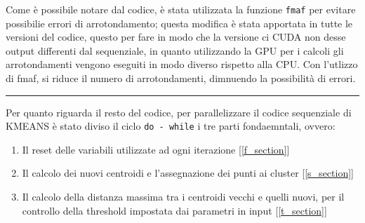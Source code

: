 \documentclass{article}
\begin{document}
  Come è possibile notare dal codice, è stata utilizzata la funzione \verb|fmaf| per evitare possibilie errori
  di arrotondamento; questa modifica è stata apportata in tutte le versioni del codice, questo per fare 
  in modo che la versione ci CUDA non desse output differenti dal sequenziale, in quanto utilizzando la GPU per i calcoli 
  gli arrotondamenti vengono eseguiti in modo diverso rispetto alla CPU. Con l'utlizzo di fmaf, si riduce il numero di arrotondamenti,
  dimnuendo la possibilità di errori.
  \begin{center}
    \rule{6cm}{1pt}
  \end{center}
  Per quanto riguarda il resto del codice, per parallelizzare il codice sequenziale di KMEANS è stato diviso il ciclo \verb|do - while| i tre parti
  fondaemntali, ovvero: 
  \begin{enumerate}
    \item Il reset delle variabili utilizzate ad ogni iterazione [\ref{f_section}]
    \item Il calcolo dei nuovi centroidi e l'assegnazione dei punti ai cluster [\ref{s_section}]
    \item Il calcolo della distanza massima tra i centroidi vecchi e quelli nuovi, per il controllo della threshold impostata dai parametri in input [\ref{t_section}]
  \end{enumerate}
  
\end{document}
